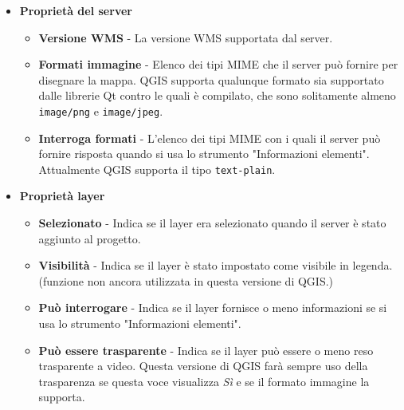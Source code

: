 \begin{itemize}[label=--]
\item \textbf{Proprietà del server}

\begin{itemize}[label=--]
\item \textbf{Versione WMS}      - La versione WMS supportata dal server.

\item \textbf{Formati immagine}  - Elenco dei tipi MIME che il server può
                                   fornire  per disegnare la mappa. QGIS
				   supporta qualunque formato sia supportato
				   dalle librerie Qt contro le quali è
				   compilato, che sono solitamente almeno \texttt{image/png}
				   e \texttt{image/jpeg}.

\item \textbf{Interroga formati} - L'elenco dei tipi MIME con i quali il server
                                   può fornire risposta quando si usa lo strumento
				   "Informazioni elementi". Attualmente QGIS supporta
				   il tipo \texttt{text-plain}.

\end{itemize}

\item \textbf{Proprietà layer}

\begin{itemize}[label=--]
\item \textbf{Selezionato}         - Indica se il layer era selezionato quando
                                     il server è stato aggiunto al progetto.

\item \textbf{Visibilità}          - Indica se il layer è stato impostato
                                     come visibile in legenda.  (funzione non ancora utilizzata
				     in questa versione di QGIS.)

\item \textbf{Può interrogare}     - Indica se il layer fornisce o meno
                                     informazioni se si usa lo strumento "Informazioni elementi".

\item \textbf{Può essere trasparente} - Indica se il layer può essere o meno
                                        reso trasparente a video. Questa
					versione di QGIS farà sempre uso della
					trasparenza se questa voce visualizza
					\textsl{Sì} e se il formato immagine
					la supporta.


\end{itemize}
\end{itemize}
